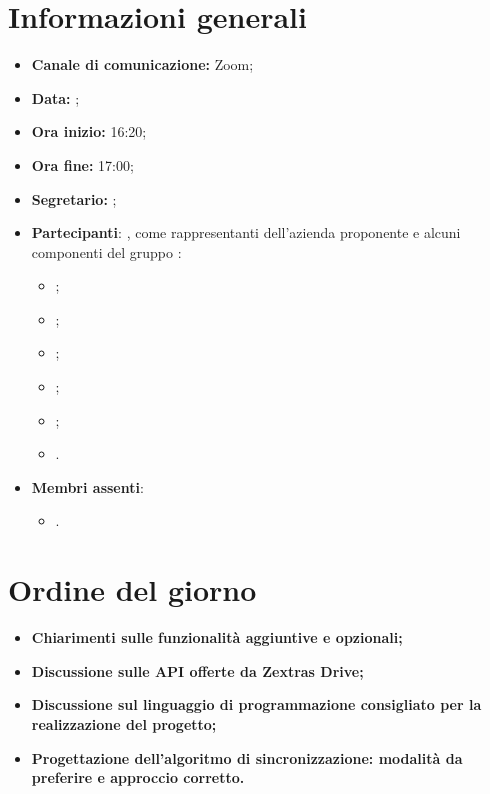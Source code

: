 \section{Informazioni generali}

\begin{itemize}

	\item \textbf{Canale di comunicazione:} Zoom;
	
	\item \textbf{Data:} \DataMeeting{};
	
	\item \textbf{Ora inizio:} 16:20;
	
	\item \textbf{Ora fine:} 17:00;
	
	\item \textbf{Segretario:} \Lucrezia{};
	
	\item \textbf{Partecipanti}: \Alessio{}, \Federico{} come rappresentanti dell'azienda proponente \proponente{} e alcuni componenti del gruppo \Gruppo{}:
	
		\begin{itemize}
			\item \Daniele{};
			\item \Davide{};
			\item \Francesco{};
			\item \Giosue{};
			\item \Lucrezia{};
			\item \Matteo{}.
		\end{itemize}



	\item \textbf{Membri assenti}:
		\begin{itemize}
			\item \Tommaso{}.
		\end{itemize}
	\end{itemize}
\section{Ordine del giorno}

\begin{itemize}
	\item\textbf{Chiarimenti sulle funzionalità aggiuntive e opzionali;}
	\item\textbf{Discussione sulle API offerte da Zextras Drive;}
	\item\textbf{Discussione sul linguaggio di programmazione consigliato per la realizzazione del progetto;}
	\item\textbf{Progettazione dell'algoritmo di sincronizzazione: modalità da preferire e approccio corretto.}


\end{itemize}

